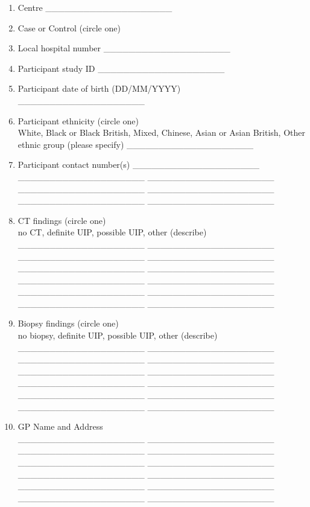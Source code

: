 \documentclass[a4paper,10pt]{article}
\begin{document}
 \begin{enumerate}
  \item Centre 
	\_\_\_\_\_\_\_\_\_\_\_\_\_\_\_\_\_\_\_\_ 
  \item Case or Control (circle one)       
  \item Local hospital number
	\_\_\_\_\_\_\_\_\_\_\_\_\_\_\_\_\_\_\_\_ 
  \item Participant study ID 	
	\_\_\_\_\_\_\_\_\_\_\_\_\_\_\_\_\_\_\_\_ 
  \item Participant date of birth (DD/MM/YYYY)
	\_\_\_\_\_\_\_\_\_\_\_\_\_\_\_\_\_\_\_\_ 
  \item Participant ethnicity (circle one) \\
      White, Black or Black British, Mixed, Chinese, Asian or Asian British, Other ethnic group (please specify)
	\_\_\_\_\_\_\_\_\_\_\_\_\_\_\_\_\_\_\_\_ 
  \item Participant contact number(s)
	\_\_\_\_\_\_\_\_\_\_\_\_\_\_\_\_\_\_\_\_ 
	\_\_\_\_\_\_\_\_\_\_\_\_\_\_\_\_\_\_\_\_ 
	\_\_\_\_\_\_\_\_\_\_\_\_\_\_\_\_\_\_\_\_ 
	\_\_\_\_\_\_\_\_\_\_\_\_\_\_\_\_\_\_\_\_ 
	\_\_\_\_\_\_\_\_\_\_\_\_\_\_\_\_\_\_\_\_ 
    \_\_\_\_\_\_\_\_\_\_\_\_\_\_\_\_\_\_\_\_ 
	\_\_\_\_\_\_\_\_\_\_\_\_\_\_\_\_\_\_\_\_ 


  \item CT findings (circle one) \\
      no CT, definite UIP, possible UIP, other (describe)
    \_\_\_\_\_\_\_\_\_\_\_\_\_\_\_\_\_\_\_\_ 
	\_\_\_\_\_\_\_\_\_\_\_\_\_\_\_\_\_\_\_\_ 
	\_\_\_\_\_\_\_\_\_\_\_\_\_\_\_\_\_\_\_\_ 
	\_\_\_\_\_\_\_\_\_\_\_\_\_\_\_\_\_\_\_\_ 
	\_\_\_\_\_\_\_\_\_\_\_\_\_\_\_\_\_\_\_\_ 
	\_\_\_\_\_\_\_\_\_\_\_\_\_\_\_\_\_\_\_\_ 
	\_\_\_\_\_\_\_\_\_\_\_\_\_\_\_\_\_\_\_\_ 
	\_\_\_\_\_\_\_\_\_\_\_\_\_\_\_\_\_\_\_\_ 
	\_\_\_\_\_\_\_\_\_\_\_\_\_\_\_\_\_\_\_\_ 
	\_\_\_\_\_\_\_\_\_\_\_\_\_\_\_\_\_\_\_\_ 
	\_\_\_\_\_\_\_\_\_\_\_\_\_\_\_\_\_\_\_\_ 
	\_\_\_\_\_\_\_\_\_\_\_\_\_\_\_\_\_\_\_\_ 
 \item Biopsy findings (circle one) \\
      no biopsy, definite UIP, possible UIP, other (describe)
    \_\_\_\_\_\_\_\_\_\_\_\_\_\_\_\_\_\_\_\_ 
	\_\_\_\_\_\_\_\_\_\_\_\_\_\_\_\_\_\_\_\_ 
	\_\_\_\_\_\_\_\_\_\_\_\_\_\_\_\_\_\_\_\_ 
	\_\_\_\_\_\_\_\_\_\_\_\_\_\_\_\_\_\_\_\_ 
	\_\_\_\_\_\_\_\_\_\_\_\_\_\_\_\_\_\_\_\_ 
	\_\_\_\_\_\_\_\_\_\_\_\_\_\_\_\_\_\_\_\_ 
	\_\_\_\_\_\_\_\_\_\_\_\_\_\_\_\_\_\_\_\_ 
	\_\_\_\_\_\_\_\_\_\_\_\_\_\_\_\_\_\_\_\_ 
	\_\_\_\_\_\_\_\_\_\_\_\_\_\_\_\_\_\_\_\_ 
	\_\_\_\_\_\_\_\_\_\_\_\_\_\_\_\_\_\_\_\_ 
	\_\_\_\_\_\_\_\_\_\_\_\_\_\_\_\_\_\_\_\_ 
	\_\_\_\_\_\_\_\_\_\_\_\_\_\_\_\_\_\_\_\_ 
\item GP Name and Address \\
    \_\_\_\_\_\_\_\_\_\_\_\_\_\_\_\_\_\_\_\_ 
	\_\_\_\_\_\_\_\_\_\_\_\_\_\_\_\_\_\_\_\_ 
	\_\_\_\_\_\_\_\_\_\_\_\_\_\_\_\_\_\_\_\_ 
	\_\_\_\_\_\_\_\_\_\_\_\_\_\_\_\_\_\_\_\_ 
	\_\_\_\_\_\_\_\_\_\_\_\_\_\_\_\_\_\_\_\_ 
	\_\_\_\_\_\_\_\_\_\_\_\_\_\_\_\_\_\_\_\_ 
	\_\_\_\_\_\_\_\_\_\_\_\_\_\_\_\_\_\_\_\_ 
	\_\_\_\_\_\_\_\_\_\_\_\_\_\_\_\_\_\_\_\_ 
	\_\_\_\_\_\_\_\_\_\_\_\_\_\_\_\_\_\_\_\_ 
	\_\_\_\_\_\_\_\_\_\_\_\_\_\_\_\_\_\_\_\_ 
	\_\_\_\_\_\_\_\_\_\_\_\_\_\_\_\_\_\_\_\_ 
	\_\_\_\_\_\_\_\_\_\_\_\_\_\_\_\_\_\_\_\_ 


\end{enumerate}
\end{document}
